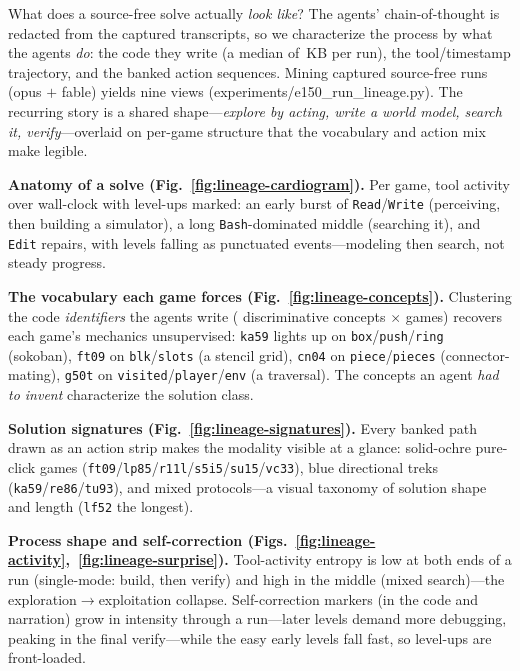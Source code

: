 \documentclass[11pt]{article}
\begin{document}
What does a source-free solve actually \emph{look like}? The agents' chain-of-thought is redacted from the
captured transcripts, so we characterize the process by what the agents \emph{do}: the code they write (a
median of \ArcLineageCodeKB{}\,KB per run), the tool/timestamp trajectory, and the banked action sequences.
Mining \ArcLineageRuns{} captured source-free runs (opus $+$ fable) yields nine views
(experiments/e150\_run\_lineage.py). The recurring story is a shared shape---\emph{explore by acting, write
a world model, search it, verify}---overlaid on per-game structure that the vocabulary and action mix make
legible.

\textbf{Anatomy of a solve (Fig.~\ref{fig:lineage-cardiogram}).} Per game, tool activity over wall-clock
with level-ups marked: an early burst of \texttt{Read}/\texttt{Write} (perceiving, then building a
simulator), a long \texttt{Bash}-dominated middle (searching it), and \texttt{Edit} repairs, with levels
falling as punctuated events---modeling then search, not steady progress.

\textbf{The vocabulary each game forces (Fig.~\ref{fig:lineage-concepts}).} Clustering the code
\emph{identifiers} the agents write (\ArcLineageConcepts{} discriminative concepts $\times$ games) recovers
each game's mechanics unsupervised: \texttt{ka59} lights up on \texttt{box}/\texttt{push}/\texttt{ring}
(sokoban), \texttt{ft09} on \texttt{blk}/\texttt{slots} (a stencil grid), \texttt{cn04} on
\texttt{piece}/\texttt{pieces} (connector-mating), \texttt{g50t} on \texttt{visited}/\texttt{player}/\texttt{env}
(a traversal). The concepts an agent \emph{had to invent} characterize the solution class.

\textbf{Solution signatures (Fig.~\ref{fig:lineage-signatures}).} Every banked path drawn as an action
strip makes the modality visible at a glance: solid-ochre pure-click games
(\texttt{ft09}/\texttt{lp85}/\texttt{r11l}/\texttt{s5i5}/\texttt{su15}/\texttt{vc33}), blue directional
treks (\texttt{ka59}/\texttt{re86}/\texttt{tu93}), and mixed protocols---a visual taxonomy of solution
shape and length (\texttt{lf52} the longest).

\textbf{Process shape and self-correction (Figs.~\ref{fig:lineage-activity},~\ref{fig:lineage-surprise}).}
Tool-activity entropy is low at both ends of a run (single-mode: build, then verify) and high in the
middle (mixed search)---the exploration$\to$exploitation collapse. Self-correction markers (in the code
and narration) grow in intensity through a run---later levels demand more debugging, peaking in the final
verify---while the easy early levels fall fast, so level-ups are front-loaded.
\end{document}
